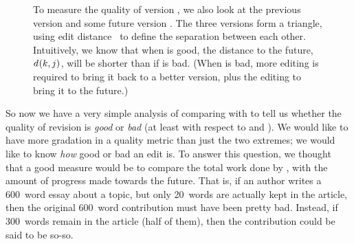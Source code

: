 \begin{figure}[t]
\centering
{}
\hspace{1ex}
\caption{To measure the quality of version , we also
	look at the previous version  and some future
	version .
	The three versions form a triangle, using
	edit distance~\cite{Levenshtein1966} to define the separation
	between each other.
	Intuitively, we know that when  is good,
	the distance to the future, $d_{}(k, j)$,
	will be shorter than if  is bad.
	(When  is bad, more editing is required to
	bring it back to a better version, plus the editing
	to bring it to the future.)
}
\label{fig-editcontr}
\end{figure}

So now we have a very simple analysis of comparing
 with  to tell us whether the
quality of revision  is \textit{good} or \textit{bad}
(at least with respect to  and ).
We would like to have more gradation in a quality metric than
just the two extremes; we would like to know \textit{how} good
or bad an edit is.
To answer this question, we thought that a good measure would
be to compare the total work done by ,
with the amount of progress made towards the future.
That is, if an author writes a 600~word essay about a topic,
but only 20~words are actually kept in the article, then the
original 600~word contribution must have been pretty bad.
Instead, if 300~words remain in the article (half of them),
then the contribution could be said to be so-so.

